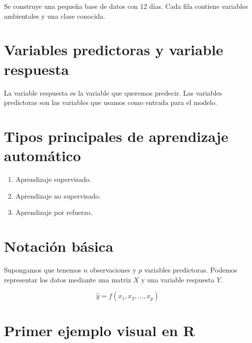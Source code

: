 \documentclass[
  spanish,
  10.5pt,
  letterpaper,
  openany,
  headings=big]{scrbook}
\providecommand{\tightlist}{%
  \setlength{\itemsep}{0pt}\setlength{\parskip}{0pt}}
\begin{document}
\begin{tcolorbox}[enhanced jigsaw, arc=.35mm, bottomrule=.15mm, bottomtitle=1mm, breakable, colback=white, colbacktitle=quarto-callout-note-color!10!white, colframe=quarto-callout-note-color-frame, coltitle=black, left=2mm, leftrule=.75mm, opacityback=0, opacitybacktitle=0.6, rightrule=.15mm, title=\textcolor{quarto-callout-note-color}{\faInfo}\hspace{0.5em}{Explicación del código}, titlerule=0mm, toprule=.15mm, toptitle=1mm]

Se construye una pequeña base de datos con 12 días. Cada fila contiene
variables ambientales y una clase conocida.

\end{tcolorbox}

\section{Variables predictoras y variable
respuesta}\label{variables-predictoras-y-variable-respuesta}

La variable respuesta es la variable que queremos predecir. Las
variables predictoras son las variables que usamos como entrada para el
modelo.

\section{Tipos principales de aprendizaje
automático}\label{tipos-principales-de-aprendizaje-automuxe1tico}

\begin{enumerate}
\def\labelenumi{\arabic{enumi}.}
\tightlist
\item
  Aprendizaje supervisado.
\item
  Aprendizaje no supervisado.
\item
  Aprendizaje por refuerzo.
\end{enumerate}

\section{Notación básica}\label{notaciuxf3n-buxe1sica}

Supongamos que tenemos \(n\) observaciones y \(p\) variables
predictoras. Podemos representar los datos mediante una matriz \(X\) y
una variable respuesta \(Y\).

\[
\hat{y} = f(x_1, x_2, \ldots, x_p)
\]

\section{Primer ejemplo visual en R}\label{primer-ejemplo-visual-en-r}
\end{document}
